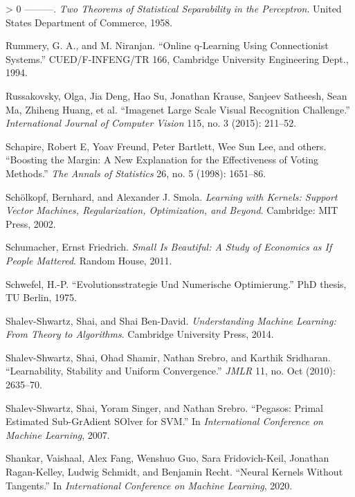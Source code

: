 \documentclass{tufte-book}
\newlength{\cslhangindent}
\newenvironment{CSLReferences}[3] %
 {%
  \setlength{\parindent}{0pt}
  \ifodd #1 \everypar{\setlength{\hangindent}{\cslhangindent}}\ignorespaces\fi
  \ifnum #2 > 0
  \setlength{\parskip}{#3\baselineskip}
  \fi
 }%
 {
 }
\begin{document}
\begin{CSLReferences}{1}{0}
\leavevmode\hypertarget{ref-rosenblatt1958two}{}%
---------. \emph{Two Theorems of Statistical Separability in the
Perceptron}. United States Department of Commerce, 1958.

\leavevmode\hypertarget{ref-SARSA}{}%
Rummery, G. A., and M. Niranjan. {``Online q-Learning Using
Connectionist Systems.''} CUED/F-INFENG/TR 166, Cambridge University
Engineering Dept., 1994.

\leavevmode\hypertarget{ref-russakovsky2015imagenet}{}%
Russakovsky, Olga, Jia Deng, Hao Su, Jonathan Krause, Sanjeev Satheesh,
Sean Ma, Zhiheng Huang, et al. {``Imagenet Large Scale Visual
Recognition Challenge.''} \emph{International Journal of Computer
Vision} 115, no. 3 (2015): 211--52.

\leavevmode\hypertarget{ref-schapire1998boosting}{}%
Schapire, Robert E, Yoav Freund, Peter Bartlett, Wee Sun Lee, and
others. {``Boosting the Margin: A New Explanation for the Effectiveness
of Voting Methods.''} \emph{The Annals of Statistics} 26, no. 5 (1998):
1651--86.

\leavevmode\hypertarget{ref-SchoelkopfKernelBook}{}%
Schölkopf, Bernhard, and Alexander J. Smola. \emph{Learning with
Kernels: Support Vector Machines, Regularization, Optimization, and
Beyond}. Cambridge: MIT Press, 2002.

\leavevmode\hypertarget{ref-schumacher2011small}{}%
Schumacher, Ernst Friedrich. \emph{Small Is Beautiful: A Study of
Economics as If People Mattered}. Random House, 2011.

\leavevmode\hypertarget{ref-SchwefelThesis}{}%
Schwefel, H.-P. {``Evolutionsstrategie Und Numerische Optimierung.''}
PhD thesis, TU Berlin, 1975.

\leavevmode\hypertarget{ref-shalev2014understanding}{}%
Shalev-Shwartz, Shai, and Shai Ben-David. \emph{Understanding Machine
Learning: From Theory to Algorithms}. Cambridge University Press, 2014.

\leavevmode\hypertarget{ref-shalev2010learnability}{}%
Shalev-Shwartz, Shai, Ohad Shamir, Nathan Srebro, and Karthik Sridharan.
{``Learnability, Stability and Uniform Convergence.''} \emph{JMLR} 11,
no. Oct (2010): 2635--70.

\leavevmode\hypertarget{ref-Pegasos}{}%
Shalev-Shwartz, Shai, Yoram Singer, and Nathan Srebro. {``Pegasos:
{P}rimal Estimated Sub-{G}r{A}dient {SO}lver for {SVM}.''} In
\emph{International Conference on Machine Learning}, 2007.

\leavevmode\hypertarget{ref-Shankar20a}{}%
Shankar, Vaishaal, Alex Fang, Wenshuo Guo, Sara Fridovich-Keil, Jonathan
Ragan-Kelley, Ludwig Schmidt, and Benjamin Recht. {``Neural Kernels
Without Tangents.''} In \emph{International Conference on Machine
Learning}, 2020.


\end{CSLReferences}
\end{document}
